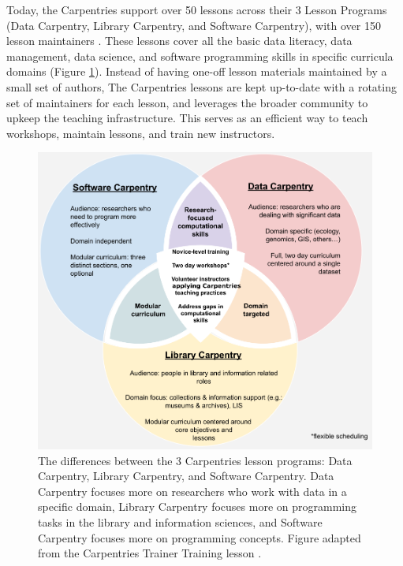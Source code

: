 \documentclass[010-intro.tex]{subfiles}
\begin{document}
        Today, the Carpentries support over 50 lessons across their 3 Lesson Programs
        (Data Carpentry, Library Carpentry, and Software Carpentry),
        with over 150 lesson maintainers
        \cite{chenPointContactEach}.
        These lessons cover all the basic data literacy, data management, data science, and software programming
        skills in specific curricula domains (Figure \ref{fig:carpentries-venn}).
        Instead of having one-off lesson materials maintained by a small set of authors,
        The Carpentries lessons are kept up-to-date with a rotating set of maintainers for each lesson,
        and leverages the broader community to upkeep the teaching infrastructure.
        This serves as an efficient way to teach workshops, maintain lessons, and train new instructors.

        \begin{figure}[htb]
            \centering
            \includegraphics[scale=0.5]{figs/050-intro/carpentries-venn}
            \caption[Differences between Carpentries Lesson programs]{
            The differences between the 3 Carpentries lesson programs: Data Carpentry, Library Carpentry, and Software Carpentry.
            Data Carpentry focuses more on researchers who work with data in a specific domain,
            Library Carpentry focuses more on programming tasks in the library and information sciences, and
            Software Carpentry focuses more on programming concepts.
            Figure adapted from the Carpentries Trainer Training lesson \cite{thecarpentriesCarpentryTrainerTraining}.
            }
            \label{fig:carpentries-venn}
        \end{figure}
\end{document}
